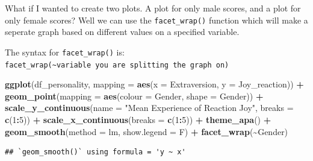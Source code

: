 \documentclass[
]{book}
\newenvironment{Shaded}{\begin{snugshade}}{\end{snugshade}}
\newcommand{\AttributeTok}[1]{\textcolor[rgb]{0.13,0.29,0.53}{#1}}
\newcommand{\DecValTok}[1]{\textcolor[rgb]{0.00,0.00,0.81}{#1}}
\newcommand{\FunctionTok}[1]{\textcolor[rgb]{0.13,0.29,0.53}{\textbf{#1}}}
\newcommand{\NormalTok}[1]{#1}
\newcommand{\SpecialCharTok}[1]{\textcolor[rgb]{0.81,0.36,0.00}{\textbf{#1}}}
\newcommand{\StringTok}[1]{\textcolor[rgb]{0.31,0.60,0.02}{#1}}
\begin{document}
What if I wanted to create two plots. A plot for only male scores, and a plot for only female scores? Well we can use the \texttt{facet\_wrap()} function which will make a seperate graph based on different values on a specified variable.

The syntax for \texttt{facet\_wrap()} is: \texttt{facet\_wrap(\textasciitilde{}variable\ you\ are\ splitting\ the\ graph\ on)}

\begin{Shaded}
\begin{Highlighting}[]
\FunctionTok{ggplot}\NormalTok{(df\_personality, }\AttributeTok{mapping =} \FunctionTok{aes}\NormalTok{(}\AttributeTok{x =}\NormalTok{ Extraversion, }\AttributeTok{y =}\NormalTok{ Joy\_reaction)) }\SpecialCharTok{+}
  \FunctionTok{geom\_point}\NormalTok{(}\AttributeTok{mapping =} \FunctionTok{aes}\NormalTok{(}\AttributeTok{colour =}\NormalTok{ Gender, }\AttributeTok{shape =}\NormalTok{ Gender)) }\SpecialCharTok{+}
  \FunctionTok{scale\_y\_continuous}\NormalTok{(}\AttributeTok{name =} \StringTok{"Mean Experience of Reaction Joy"}\NormalTok{, }\AttributeTok{breaks =} \FunctionTok{c}\NormalTok{(}\DecValTok{1}\SpecialCharTok{:}\DecValTok{5}\NormalTok{)) }\SpecialCharTok{+}
  \FunctionTok{scale\_x\_continuous}\NormalTok{(}\AttributeTok{breaks =} \FunctionTok{c}\NormalTok{(}\DecValTok{1}\SpecialCharTok{:}\DecValTok{5}\NormalTok{)) }\SpecialCharTok{+}
  \FunctionTok{theme\_apa}\NormalTok{() }\SpecialCharTok{+}
  \FunctionTok{geom\_smooth}\NormalTok{(}\AttributeTok{method =}\NormalTok{ lm, }\AttributeTok{show.legend =}\NormalTok{ F) }\SpecialCharTok{+}
  \FunctionTok{facet\_wrap}\NormalTok{(}\SpecialCharTok{\textasciitilde{}}\NormalTok{Gender)}
\end{Highlighting}
\end{Shaded}

\begin{verbatim}
## `geom_smooth()` using formula = 'y ~ x'
\end{verbatim}
\end{document}
